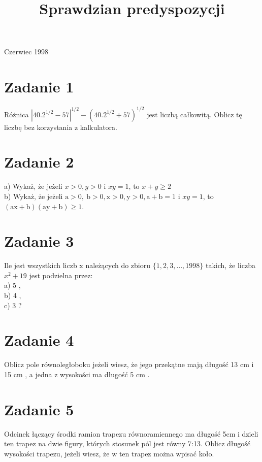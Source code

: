 \documentclass[10pt]{article}
\title{Sprawdzian predyspozycji }
\author{}
\date{}
\begin{document}
\maketitle
Czerwiec 1998

\section*{Zadanie 1}
Różnica \(\left|40.2^{1 / 2}-57\right|^{1 / 2}-\left(40.2^{1 / 2}+57\right)^{1 / 2}\) jest liczbą całkowitą. Oblicz tę liczbę bez korzystania z kalkulatora.

\section*{Zadanie 2}
a) Wykaż, że jeżeli \(x>0, y>0\) i \(x y=1\), to \(x+y \geq 2\)\\
b) Wykaż, że jeżeli \(\mathrm{a}>0, \mathrm{~b}>0, \mathrm{x}>0, \mathrm{y}>0, \mathrm{a}+\mathrm{b}=1\) i \(x y=1\), to \((\mathrm{ax}+\mathrm{b})(\mathrm{ay}+\mathrm{b}) \geq 1\).

\section*{Zadanie 3}
Ile jest wszystkich liczb x należących do zbioru \(\{1,2,3, \ldots, 1998\}\) takich, że liczba \(x^{2}+19\) jest podzielna przez:\\
a) 5 ,\\
b) 4 ,\\
c) 3 ?

\section*{Zadanie 4}
Oblicz pole równoległoboku jeżeli wiesz, że jego przekątne mają długość 13 cm i 15 cm , a jedna z wysokości ma długość 5 cm .

\section*{Zadanie 5}
Odcinek łączący środki ramion trapezu równoramiennego ma długość 5cm i dzieli ten trapez na dwie figury, których stosunek pól jest równy 7:13. Oblicz długość wysokości trapezu, jeżeli wiesz, że w ten trapez można wpisać koło.
\end{document}
